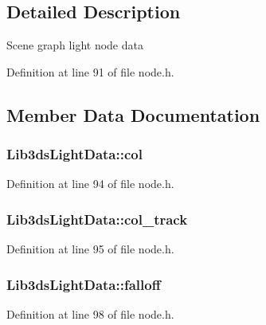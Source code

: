 \subsection{Detailed Description}
Scene graph light node data 

Definition at line 91 of file node.\-h.



\subsection{Member Data Documentation}
\hypertarget{struct_lib3ds_light_data_a82752df09c03827a9e14ac4d443117ed}{
\subsubsection[{col}]{ Lib3ds\-Light\-Data\-::col}}\label{struct_lib3ds_light_data_a82752df09c03827a9e14ac4d443117ed}


Definition at line 94 of file node.\-h.

\hypertarget{struct_lib3ds_light_data_a6bdc5270b3fa4945a56923c064c9312f}{
\subsubsection[{col\-\_\-track}]{ Lib3ds\-Light\-Data\-::col\-\_\-track}}\label{struct_lib3ds_light_data_a6bdc5270b3fa4945a56923c064c9312f}


Definition at line 95 of file node.\-h.

\hypertarget{struct_lib3ds_light_data_a319a2691acc75a8d9ee77dcf1269fa9f}{
\subsubsection[{falloff}]{ Lib3ds\-Light\-Data\-::falloff}}\label{struct_lib3ds_light_data_a319a2691acc75a8d9ee77dcf1269fa9f}


Definition at line 98 of file node.\-h.

